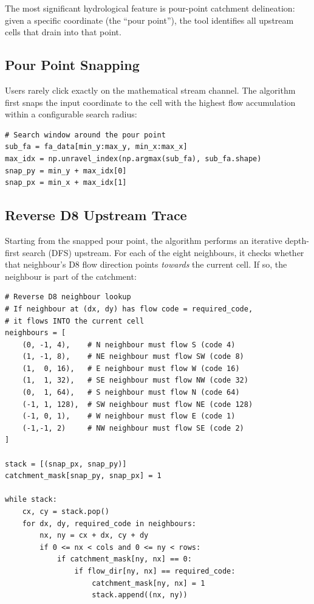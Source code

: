 The most significant hydrological feature is pour-point catchment delineation:
given a specific coordinate (the ``pour point''), the tool identifies all upstream
cells that drain into that point.

\subsection{Pour Point Snapping}

Users rarely click exactly on the mathematical stream channel.  The algorithm
first snaps the input coordinate to the cell with the highest flow accumulation
within a configurable search radius:

\begin{lstlisting}
# Search window around the pour point
sub_fa = fa_data[min_y:max_y, min_x:max_x]
max_idx = np.unravel_index(np.argmax(sub_fa), sub_fa.shape)
snap_py = min_y + max_idx[0]
snap_px = min_x + max_idx[1]
\end{lstlisting}

\subsection{Reverse D8 Upstream Trace}

Starting from the snapped pour point, the algorithm performs an iterative
depth-first search (DFS) upstream.  For each of the eight neighbours, it checks
whether that neighbour's D8 flow direction points \emph{towards} the current
cell.  If so, the neighbour is part of the catchment:

\begin{lstlisting}
# Reverse D8 neighbour lookup
# If neighbour at (dx, dy) has flow code = required_code,
# it flows INTO the current cell
neighbours = [
    (0, -1, 4),    # N neighbour must flow S (code 4)
    (1, -1, 8),    # NE neighbour must flow SW (code 8)
    (1,  0, 16),   # E neighbour must flow W (code 16)
    (1,  1, 32),   # SE neighbour must flow NW (code 32)
    (0,  1, 64),   # S neighbour must flow N (code 64)
    (-1, 1, 128),  # SW neighbour must flow NE (code 128)
    (-1, 0, 1),    # W neighbour must flow E (code 1)
    (-1,-1, 2)     # NW neighbour must flow SE (code 2)
]

stack = [(snap_px, snap_py)]
catchment_mask[snap_py, snap_px] = 1

while stack:
    cx, cy = stack.pop()
    for dx, dy, required_code in neighbours:
        nx, ny = cx + dx, cy + dy
        if 0 <= nx < cols and 0 <= ny < rows:
            if catchment_mask[ny, nx] == 0:
                if flow_dir[ny, nx] == required_code:
                    catchment_mask[ny, nx] = 1
                    stack.append((nx, ny))
\end{lstlisting}

